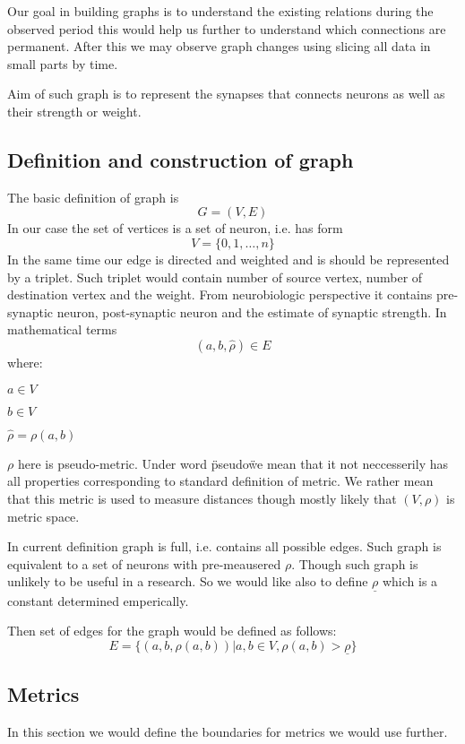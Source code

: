 \documentclass{article}
\begin{document}
	Our goal in building graphs is to understand the existing relations during the observed period this would help us
	further to understand which connections are permanent.
	After this we may observe graph changes using slicing all data in small parts by time.

	Aim of such graph is to represent the synapses that connects neurons as well as their strength or weight.

	\subsection{Definition and construction of graph}\label{subsec:definition-and-construction-of-graph}
	The basic definition of graph is
	\[
	 G=(V,E)
	\]
	In our case the set of vertices is a set of neuron, i.e. has form
	\[
		V=\{0, 1, \dots, n\}
	\]
	In the same time our edge is directed and weighted and is should be represented by a triplet. Such triplet
	would contain number of source vertex, number of destination vertex and the weight. From neurobiologic perspective
	it contains pre-synaptic neuron, post-synaptic neuron and the estimate of synaptic strength. In mathematical terms
	\[
		(a, b, \hat\rho) \in E
	\]
	where:

	\textbullet    $a\in V$

	\textbullet    $b\in V$

	\textbullet    $\hat\rho = \rho(a, b)$

	$\rho$ here is pseudo-metric. Under word \"pseudo\" we mean that it not neccesserily has all properties corresponding
	to standard definition of metric. We rather mean that this metric is used to measure distances though mostly likely
	that $(V, \rho)$ is metric space.

	In current definition graph is full, i.e. contains all possible edges. Such graph is equivalent to a set of neurons
	with pre-meausered $\rho$. Though such graph is unlikely to be useful in a research. So we would like also to define
	$\underline\rho$ which is a constant determined emperically.

	Then set of edges for the graph would be defined as follows:
	\[
		E=\{(a,b, \rho(a,b)) | a,b \in V, \rho(a,b)>\underline{\rho}\}
	\]

	\subsection{Metrics}\label{subsec:metrics}
	In this section we would define the boundaries for metrics we would use further.
\end{document}
